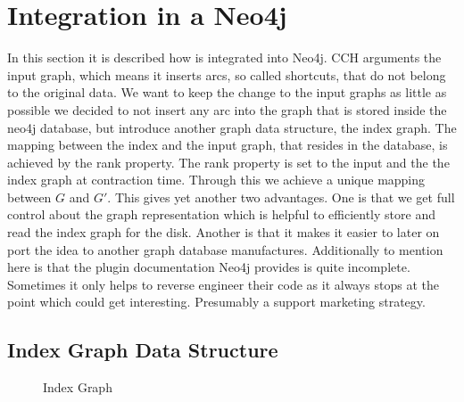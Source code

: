 \chapter{Integration in a Neo4j}

In this section it is described how \cite[Customization Contraction Hierarchies]{CCH} is integrated into Neo4j.
CCH arguments the input graph, which means it inserts arcs, so called shortcuts, that do not belong to the original data.
We want to keep the change to the input graphs as little as possible we decided to not insert any arc into the graph that is stored inside the neo4j database, but introduce another graph data structure, the index graph.
The mapping between the index and the input graph, that resides in the database, is achieved by the rank property.
The rank property is set to the input and the the index graph at contraction time.
Through this we achieve a unique mapping between $G$ and $G'$.
This gives yet another two advantages.
One is that we get full control about the graph representation which is helpful to efficiently store and read the index graph for the disk.
Another is that it makes it easier to later on port the idea to another graph database manufactures.
Additionally to mention here is that the plugin documentation Neo4j provides is quite incomplete. 
Sometimes it only helps to reverse engineer their code as it always stops at the point which could get interesting. 
Presumably a support marketing strategy. 

\section{Index Graph Data Structure}\label{sec:index_graph}

\begin{figure}
     
    
    \caption{Index Graph}
    \label{uml:index_graph}
\end{figure}

